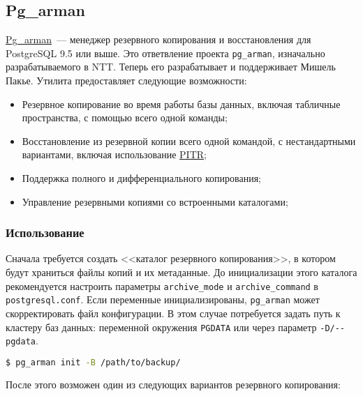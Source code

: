 \subsection{Pg\_arman}

\href{https://github.com/michaelpq/pg\_arman}{Pg\_arman}~--- менеджер резервного копирования и восстановления для PostgreSQL 9.5 или выше. Это ответвление проекта \lstinline!pg_arman!, изначально разрабатываемого в NTT. Теперь его разрабатывает и поддерживает Мишель Пакье. Утилита предоставляет следующие возможности:

\begin{itemize}
  \item Резервное копирование во время работы базы данных, включая табличные пространства, с помощью всего одной команды;
  \item Восстановление из резервной копии всего одной командой, с нестандартными вариантами, включая использование \href{https://www.postgresql.org/docs/current/static/continuous-archiving.html}{PITR};
  \item Поддержка полного и дифференциального копирования;
  \item Управление резервными копиями со встроенными каталогами;
\end{itemize}


\subsubsection{Использование}

Сначала требуется создать <<каталог резервного копирования>>, в котором будут храниться файлы копий и их метаданные. До инициализации этого каталога рекомендуется настроить параметры \lstinline!archive_mode! и \lstinline!archive_command! в \lstinline!postgresql.conf!. Если переменные инициализированы, \lstinline!pg_arman! может скорректировать файл конфигурации. В этом случае потребуется задать путь к кластеру баз данных: переменной окружения \lstinline!PGDATA! или через параметр \lstinline!-D/--pgdata!.

\begin{lstlisting}[language=Bash,label=lst:pgarman1,caption=init]
$ pg_arman init -B /path/to/backup/
\end{lstlisting}

После этого возможен один из следующих вариантов резервного копирования:

